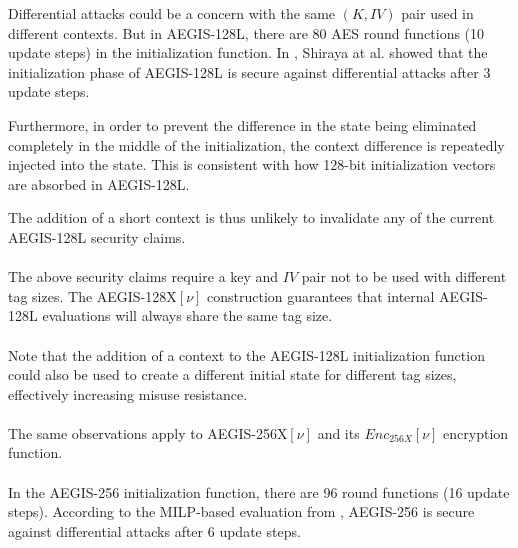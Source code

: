 \documentclass[envcountsame,runningheads,notitlepage]{llncs}
\begin{document}
Differential attacks could be a concern with the same $(K, IV)$ pair used in different contexts.
But in AEGIS-128L, there are 80 AES round functions (10 update steps) in the initialization function. In \cite{STSI23}, Shiraya at al. showed that the initialization phase of AEGIS-128L is secure against differential attacks after 3 update steps.

Furthermore, in order to prevent the difference in the state being eliminated completely in the middle of the initialization, the context difference is repeatedly injected into the state. This is consistent with how 128-bit initialization vectors are absorbed in AEGIS-128L.

The addition of a short context is thus unlikely to invalidate any of the current AEGIS-128L security claims.

\paragraph{}

The above security claims require a key and $IV$ pair not to be used with different tag sizes. The AEGIS-128X$[\nu]$ construction guarantees that internal AEGIS-128L evaluations will always share the same tag size.

\paragraph{}

Note that the addition of a context to the AEGIS-128L initialization function could also be used to create a different initial state for different tag sizes, effectively increasing misuse resistance.

\paragraph{}

The same observations apply to AEGIS-256X$[\nu]$ and its $Enc_{256X}[\nu]$ encryption function.

\paragraph{}

In the AEGIS-256 initialization function, there are 96 round functions (16 update steps). According to the MILP-based evaluation from \cite{STSI23}, AEGIS-256 is secure against differential attacks after 6 update steps.
\end{document}
